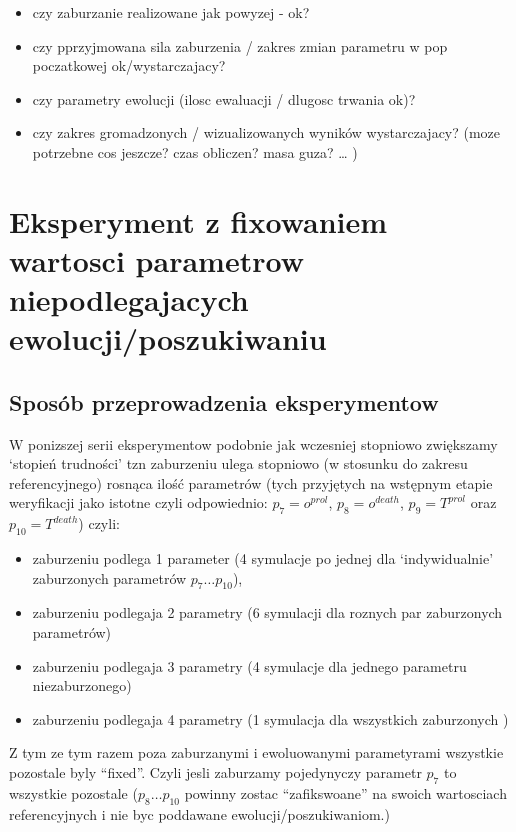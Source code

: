 \documentclass[]{article}
\providecommand{\tightlist}{%
  \setlength{\itemsep}{0pt}\setlength{\parskip}{0pt}}
\begin{document}
\begin{itemize}
\tightlist
\item
  czy zaburzanie realizowane jak powyzej - ok?
\item
  czy pprzyjmowana sila zaburzenia / zakres zmian parametru w pop
  poczatkowej ok/wystarczajacy?
\item
  czy parametry ewolucji (ilosc ewaluacji / dlugosc trwania ok)?
\item
  czy zakres gromadzonych / wizualizowanych wyników wystarczajacy? (moze
  potrzebne cos jeszcze? czas obliczen? masa guza? \ldots{} )
\end{itemize}

\newpage

\section{Eksperyment z fixowaniem wartosci parametrow niepodlegajacych
ewolucji/poszukiwaniu}\label{eksperyment-z-fixowaniem-wartosci-parametrow-niepodlegajacych-ewolucjiposzukiwaniu}

\subsection{Sposób przeprowadzenia
eksperymentow}\label{sposuxf3b-przeprowadzenia-eksperymentow}

W ponizszej serii eksperymentow podobnie jak wczesniej stopniowo
zwiększamy `stopień trudności' tzn zaburzeniu ulega stopniowo (w
stosunku do zakresu referencyjnego) rosnąca ilość parametrów (tych
przyjętych na wstępnym etapie weryfikacji jako istotne czyli
odpowiednio: \(p_7=o^{prol}\), \(p_8=o^{death}\), \(p_9=T^{prol}\) oraz
\(p_{10}=T^{death}\)) czyli:

\begin{itemize}
\tightlist
\item
  zaburzeniu podlega 1 parameter (4 symulacje po jednej dla
  `indywidualnie' zaburzonych parametrów \(p_7\ldots p_{10}\)),
\item
  zaburzeniu podlegaja 2 parametry (6 symulacji dla roznych par
  zaburzonych parametrów)
\item
  zaburzeniu podlegaja 3 parametry (4 symulacje dla jednego parametru
  niezaburzonego)
\item
  zaburzeniu podlegaja 4 parametry (1 symulacja dla wszystkich
  zaburzonych )
\end{itemize}

Z tym ze tym razem poza zaburzanymi i ewoluowanymi parametyrami
wszystkie pozostale byly ``fixed''. Czyli jesli zaburzamy pojedynyczy
parametr \(p_7\) to wszystkie pozostale (\(p_8 \ldots p_{10}\) powinny
zostac ``zafikswoane'' na swoich wartosciach referencyjnych i nie byc
poddawane ewolucji/poszukiwaniom.)
\end{document}
